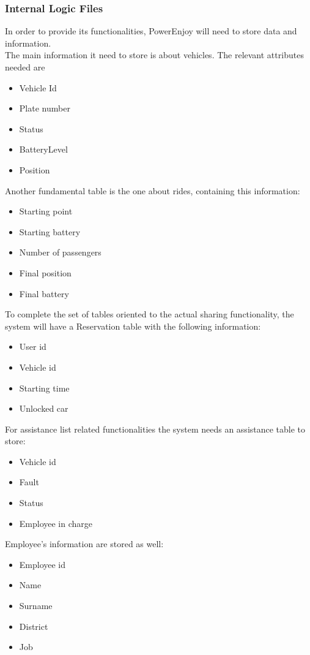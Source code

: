 \subsubsection{Internal Logic Files}
In order to provide its functionalities, PowerEnjoy will need to store data and information.\\
The main information it need to store is about vehicles. The relevant attributes needed are 
\begin{itemize}
\item Vehicle Id
\item Plate number
\item Status
\item BatteryLevel
\item Position
\end{itemize}

Another fundamental table is the one about rides, containing this information:
\begin{itemize}
\item Starting point
\item Starting battery
\item Number of passengers
\item Final position
\item Final battery
\end{itemize}

To complete the set of tables oriented to the actual sharing functionality, the system will have a Reservation table with the following information:
\begin{itemize}
\item User id
\item Vehicle id
\item Starting time
\item Unlocked car
\end{itemize}

For assistance list related functionalities the system needs an assistance table to store:
\begin{itemize}
\item Vehicle id
\item Fault
\item Status
\item Employee in charge
\end{itemize}

Employee's information are stored as well:
\begin{itemize}
\item Employee id
\item Name
\item Surname
\item District
\item Job
\end{itemize}


